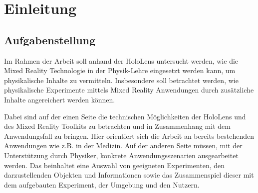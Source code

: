 \section{Einleitung}
\label{sec-1}


\subsection{Aufgabenstellung}
\label{sec-1-1}
Im Rahmen der Arbeit soll anhand der HoloLens untersucht werden, wie die Mixed Reality Technologie in der Physik-Lehre eingesetzt werden kann, um physikalische Inhalte zu vermitteln. Insbesondere soll betrachtet werden, wie physikalische Experimente mittels Mixed Reality Anwendungen durch zusätzliche Inhalte angereichert werden können.\\

\par
Dabei sind auf der einen Seite die technischen Möglichkeiten der HoloLens und des Mixed Reality Toolkits zu betrachten und in Zusammenhang mit dem Anwendungsfall zu bringen. Hier orientiert sich die Arbeit an bereits bestehenden Anwendungen wie z.B. in der Medizin. Auf der anderen Seite müssen, mit der Unterstützung durch Physiker, konkrete Anwendungsszenarien ausgearbeitet werden. Das beinhaltet eine Auswahl von geeigneten Experimenten, den darzustellenden Objekten und Informationen sowie das Zusammenspiel dieser mit dem aufgebauten Experiment, der Umgebung und den Nutzern.\\


